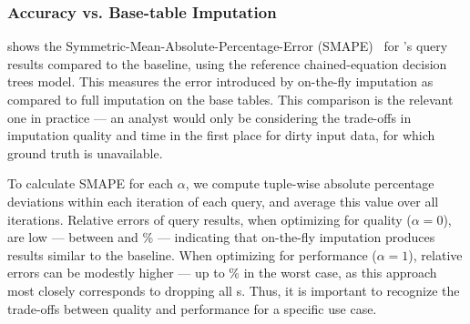 

\subsubsection{Accuracy vs. Base-table Imputation}

 shows the Symmetric-Mean-Absolute-Percentage-Error (SMAPE)~\cite{Makridakis2000451} for \ProjectName{}'s query results compared to the baseline, using the reference chained-equation decision trees model.
This measures the error introduced by on-the-fly imputation as compared to full imputation on the base tables.
This comparison is the relevant one in practice --- an analyst would only be considering the trade-offs in imputation quality and time in the first place for dirty input data, for which ground truth is unavailable.

To calculate SMAPE for each $\alpha$,
we compute tuple-wise absolute percentage deviations within each iteration of each query, and
average this value over all iterations.
Relative errors of query results, when optimizing for quality
($\alpha=0$), are low --- between \lowsmapealphazero{} and
\highsmapealphazero{}\% --- indicating that on-the-fly imputation produces
results similar to the baseline. When optimizing for performance ($\alpha=1$),
relative errors can be modestly higher --- up to \highsmapealphaone{}\% in the
worst case, as this approach most closely corresponds to dropping all
\nullv{}s. Thus, it is important to recognize the trade-offs between quality and
performance for a specific use case.

